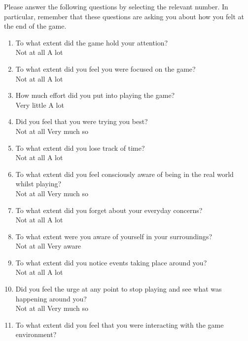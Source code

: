 \documentclass[../II2202-proposal.tex]{subfiles}
\begin{document}
Please answer the following questions by selecting the relevant number.
In particular, remember that these questions are asking you about how you felt at the end of the game.

\begin{enumerate}
    \item To what extent did the game hold your attention? \\
    Not at all      \quad A lot
    \item To what extent did you feel you were focused on the game? \\
    Not at all      \quad A lot
    \item How much effort did you put into playing the game? \\
    Very little      \quad A lot
    \item Did you feel that you were trying you best? \\
    Not at all      \quad Very much so
    \item To what extent did you lose track of time? \\
    Not at all      \quad A lot
    \item To what extent did you feel consciously aware of being in the real world whilst playing? \\
    Not at all      \quad Very much so
    \item To what extent did you forget about your everyday concerns? \\
    Not at all      \quad A lot
    \item To what extent were you aware of yourself in your surroundings? \\
    Not at all      \quad Very aware
    \item To what extent did you notice events taking place around you?  \\
    Not at all      \quad A lot
    \item Did you feel the urge at any point to stop playing and see what was happening around you? \\
    Not at all      \quad Very much so
    \item To what extent did you feel that you were interacting with the game environment? \\

\end{enumerate}
\end{document}
